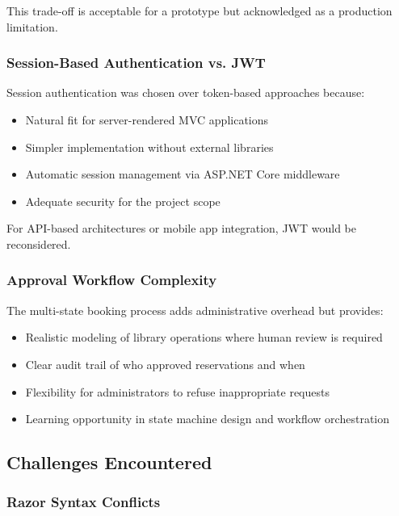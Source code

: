 \documentclass[12pt,a4paper]{article}
\begin{document}
This trade-off is acceptable for a prototype but acknowledged as a production limitation.

\subsubsection{Session-Based Authentication vs. JWT}

Session authentication was chosen over token-based approaches because:

\begin{itemize}[leftmargin=*]
    \item Natural fit for server-rendered MVC applications
    \item Simpler implementation without external libraries
    \item Automatic session management via ASP.NET Core middleware
    \item Adequate security for the project scope
\end{itemize}

For API-based architectures or mobile app integration, JWT would be reconsidered.

\subsubsection{Approval Workflow Complexity}

The multi-state booking process adds administrative overhead but provides:

\begin{itemize}[leftmargin=*]
    \item Realistic modeling of library operations where human review is required
    \item Clear audit trail of who approved reservations and when
    \item Flexibility for administrators to refuse inappropriate requests
    \item Learning opportunity in state machine design and workflow orchestration
\end{itemize}

\subsection{Challenges Encountered}

\subsubsection{Razor Syntax Conflicts}
\end{document}
